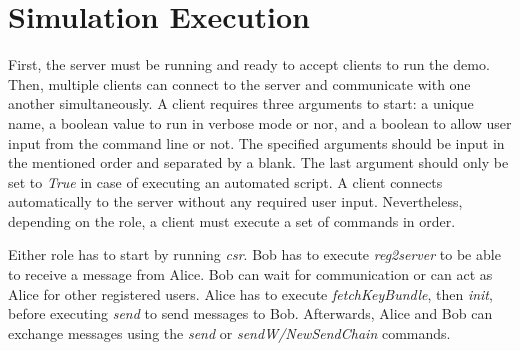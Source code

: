 \section{Simulation Execution}
First, the server must be running and ready to accept clients to run the demo. Then, multiple clients can connect to the server and communicate with one another simultaneously. A client requires three arguments to start: a unique name, a boolean value to run in verbose mode or nor, and a boolean to allow user input from the command line or not. The specified arguments should be input in the mentioned order and separated by a blank. The last argument should only be set to \textit{True} in case of executing an automated script. A client connects automatically to the server without any required user input. Nevertheless, depending on the role, a client must execute a set of commands in order.
\par
Either role has to start by running \textit{csr}. Bob has to execute \textit{reg2server} to be able to receive a message from Alice. Bob can wait for communication or can act as Alice for other registered users. Alice has to execute \textit{fetchKeyBundle}, then \textit{init}, before executing \textit{send} to send messages to Bob. Afterwards, Alice and Bob can exchange messages using the \textit{send} or \textit{sendW/NewSendChain} commands.

